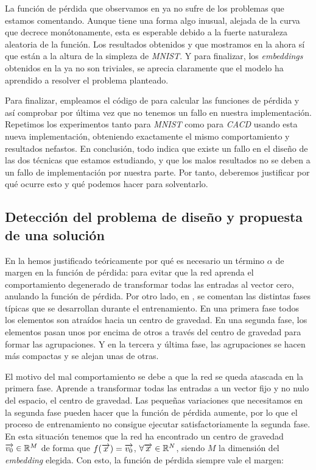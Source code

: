 La función de pérdida que observamos en  ya no sufre de los problemas que estamos comentando. Aunque tiene una forma algo inusual, alejada de la curva que decrece monótonamente, esta es esperable debido a la fuerte naturaleza aleatoria de la función. Los resultados obtenidos y que mostramos en la  ahora sí que están a la altura de la simpleza de \textit{MNIST}. Y para finalizar, los \textit{embeddings} obtenidos en la  ya no son triviales, se aprecia claramente que el modelo ha aprendido a resolver el problema planteado.

Para finalizar, empleamos el código de \cite{informatica:implementacion_batch_distancias} para calcular las funciones de pérdida y así comprobar por última vez que no tenemos un fallo en nuestra implementación. Repetimos los experimentos tanto para \textit{MNIST} como para \textit{CACD} usando esta nueva implementación, obteniendo exactamente el mismo comportamiento y resultados nefastos. En conclusión, todo indica que existe un fallo en el diseño de las dos técnicas que estamos estudiando, y que los malos resultados no se deben a un fallo de implementación por nuestra parte. Por tanto, deberemos justificar por qué ocurre esto y qué podemos hacer para solventarlo.

\subsection{Detección del problema de diseño y propuesta de una solución} \label{isubsec:identificacion_problemas_propuesta_solucion}

En la  hemos justificado teóricamente por qué es necesario un término $\alpha$ de margen en la función de pérdida: para evitar que la red aprenda el comportamiento degenerado de transformar todas las entradas al vector cero, anulando la función de pérdida. Por otro lado, en \cite{informatica:principal}, se comentan las distintas fases típicas que se desarrollan durante el entrenamiento. En una primera fase todos los elementos son atraídos hacia un centro de gravedad. En una segunda fase, los elementos pasan unos por encima de otros a través del centro de gravedad para formar las agrupaciones. Y en la tercera y última fase, las agrupaciones se hacen más compactas y se alejan unas de otras.

El motivo del mal comportamiento se debe a que la red se queda atascada en la primera fase. Aprende a transformar todas las entradas a un vector fijo y no nulo del espacio, el centro de gravedad. Las pequeñas variaciones que necesitamos en la segunda fase pueden hacer que la función de pérdida aumente, por lo que el proceso de entrenamiento no consigue ejecutar satisfactoriamente la segunda fase. En esta situación tenemos que la red ha encontrado un centro de gravedad $\overrightarrow{v_0} \in \mathbb{R}^M$ de forma que $f(\overrightarrow{x}) = \overrightarrow{v_0}$, $\forall \overrightarrow{x} \in \mathbb{R}^N$, siendo $M$ la dimensión del \textit{embedding} elegida. Con esto, la función de pérdida siempre vale el margen:


